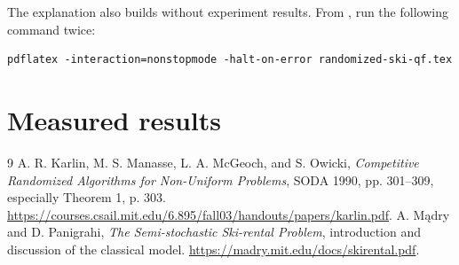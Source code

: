 \documentclass[11pt]{article}
\begin{document}
The explanation also builds without experiment results. From , run the following command twice:
\begin{verbatim}
pdflatex -interaction=nonstopmode -halt-on-error randomized-ski-qf.tex
\end{verbatim}

\section{Measured results}

\begin{thebibliography}{9}
 A. R. Karlin, M. S. Manasse, L. A. McGeoch, and S. Owicki, \emph{Competitive Randomized Algorithms for Non-Uniform Problems}, SODA 1990, pp. 301--309, especially Theorem 1, p. 303. \url{https://courses.csail.mit.edu/6.895/fall03/handouts/papers/karlin.pdf}.
 A. M\k{a}dry and D. Panigrahi, \emph{The Semi-stochastic Ski-rental Problem}, introduction and discussion of the classical model. \url{https://madry.mit.edu/docs/skirental.pdf}.
\end{thebibliography}
\end{document}
